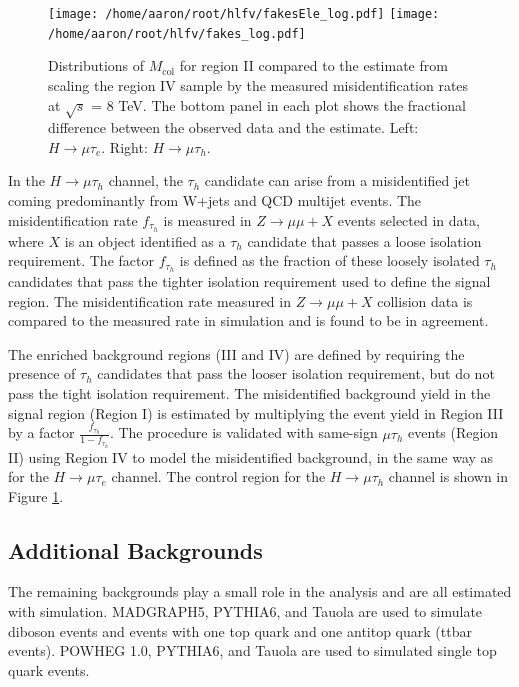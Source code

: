\documentclass[oneside, letterpaper, oldfontcommands]{memoir}
\begin{document}
\begin{figure}[hbtp]\centering
\texttt{[image: /home/aaron/root/hlfv/fakesEle\_log.pdf]}
\texttt{[image: /home/aaron/root/hlfv/fakes\_log.pdf]}
\caption{Distributions of $M_\text{col}$ for region II compared to the estimate
from scaling the region IV sample by the measured misidentification rates at $\sqrt{s}$ = 8 TeV. The bottom panel in each plot shows the fractional difference between the observed data and the estimate. Left:  $H \rightarrow \mu \tau_{e}$. Right: $H \rightarrow \mu \tau_{h}$. }
\label{fig:samesign_fakes}\end{figure}


\qquad In the $H \rightarrow \mu\tau_{h}$ channel, the $\tau_{h}$ candidate can arise from a misidentified jet coming predominantly from W+jets and QCD multijet events. The misidentification rate $f_{\tau_{h}}$ is measured in $Z \rightarrow \mu\mu +X$ events selected in data, where $X$ is an object identified as a $\tau_{h}$ candidate that passes a loose isolation requirement. The factor $f_{\tau_{h}}$ is defined as the fraction of these loosely isolated $\tau_{h}$ candidates that pass the tighter isolation requirement used to define the signal region. The misidentification rate measured in $Z\rightarrow \mu\mu+X$ collision data is compared to the measured rate in simulation and is found to be in agreement.

\qquad The enriched background regions (III and IV) are defined by requiring the presence of $\tau_{h}$ candidates that pass the looser isolation requirement, but do not pass the tight isolation requirement. The misidentified background yield in the signal region (Region I) is estimated by multiplying the event yield in Region III by a factor $\frac{f_{\tau_{h}}}{1-f_{\tau_{h}}}$. The procedure is validated with same-sign $\mu\tau_{h}$ events (Region II) using Region IV to model the misidentified background, in the same way as for the $H \rightarrow \mu\tau_{e}$ channel. The control region for the $H \rightarrow \mu\tau_{h}$ channel is shown in Figure \ref{fig:samesign_fakes}.

\subsection{Additional Backgrounds}

\qquad The remaining backgrounds play a small role in the analysis and are all estimated with simulation. MADGRAPH5, PYTHIA6, and Tauola are used to simulate diboson events and events with one top quark and one antitop quark (ttbar events). POWHEG 1.0, PYTHIA6, and Tauola are used to simulated single top quark events.
\end{document}
